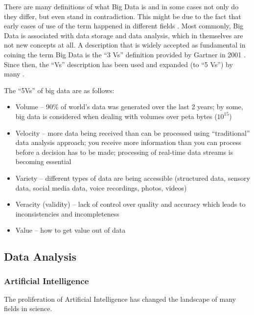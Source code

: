 There are many definitions of what Big Data is and in some cases not only do they differ, but even stand in contradiction. This might be due to the fact that early cases of use of the term happened in different fields \citep{demchenko2014defining, Ward2013}. Most commonly, Big Data is associated with data storage and data analysis, which in themselves are not new concepts at all. A description that is widely accepted as fundamental in coining the term Big Data is the “3 Vs” definition provided by Gartner in 2001 \citep{douglas20013d, Ward2013}. Since then, the “Vs” description has been used and expanded (to “5 Vs”) by many \citep{McAfee2012, minelli2012big, demchenko2014defining, NIST2015}.

The “5Vs” of big data are as follows:
\begin{itemize}
\item Volume – 90\% of world’s data was generated over the last 2 years; by some, big data is considered when dealing with volumes over peta bytes ($10^{15}$)

\item Velocity – more data being received than can be processed using “traditional” data analysis approach; you receive more information than you can process before a decision has to be made; processing of real-time data streams is becoming essential

\item Variety – different types of data are being accessible (structured data, sensory data, social media data, voice recordings, photos, videos)

\item Veracity (validity) – lack of control over quality and accuracy which leads to inconsistencies and incompleteness

\item Value – how to get value out of data
\end{itemize}

		\subsection{Data Analysis}
		
			\subsubsection{Artificial Intelligence}
			
The proliferation of Artificial Intelligence has changed the landscape of many fields in science. 


